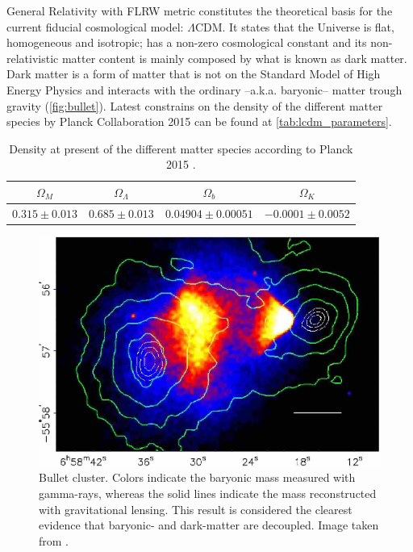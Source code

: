 General Relativity with FLRW metric constitutes the theoretical basis for the current fiducial cosmological model: $\Lambda$CDM. It states that the Universe is flat, homogeneous and isotropic; has a non-zero cosmological constant and its non-relativistic matter content is mainly composed by what is known as dark matter. Dark matter is a form of matter that is not on the Standard Model of High Energy Physics and interacts with the ordinary --a.k.a. baryonic-- matter trough gravity (\autoref{fig:bullet}). Latest constrains on the density of the different matter species by Planck Collaboration 2015 \cite{2015arXiv150201589P} can be found at \autoref{tab:lcdm_parameters}.
\begin{table}
\begin{center}
\begin{tabular}{c | c | c | c }
$\Omega_M$ & $\Omega_\Lambda$ & $\Omega_b$ & $\Omega_K$\\
\hline
$0.315\pm 0.013$ & $0.685\pm 0.013$ & $0.04904\pm 0.00051$ & $-0.0001\pm 0.0052$\\
\end{tabular}
\caption{Density at present of the different matter species according to Planck 2015 \citep{2015arXiv150201589P}.}
\label{tab:lcdm_parameters}
\end{center}
\end{table}
\begin{figure}
\includegraphics[width=\textwidth]{./Pictures/bullet_cluster.png}
\caption{Bullet cluster. Colors indicate the baryonic mass measured with gamma-rays, whereas the solid lines indicate the mass reconstructed with gravitational lensing. This result is considered the clearest evidence that baryonic- and dark-matter are decoupled. Image taken from \cite{2008PhRvD..78j4004D}.}
\label{fig:bullet}
\end{figure}

